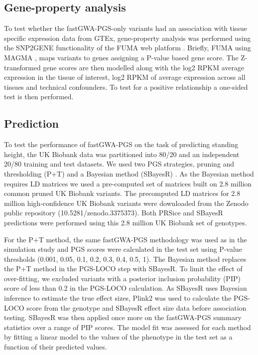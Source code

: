 \documentclass[fleqn,10pt]{wlscirep}
\begin{document}
\subsection*{Gene-property analysis}

To test whether the fastGWA-PGS-only variants had an association with tissue specific expression data from  GTEx, gene-property analysis was performed using the SNP2GENE functionality of the FUMA web platform \cite{watanabe2017functional}. Briefly, FUMA using MAGMA \cite{de2015magma}, maps variants to genes assigning a P-value based gene score. The Z-transformed gene scores are then modelled along with the log2 RPKM average expression in the tissue of interest, log2 RPKM of average expression across all tissues and technical confounders. To test for a positive relationship a one-sided test is then performed.  

\subsection*{Prediction}
To test the performance of fastGWA-PGS on the task of predicting standing height, the UK Biobank data was partitioned into 80/20 and an independent 20/80 training and test datasets. We used two PGS strategies, pruning and thresholding (P+T) and a Bayesian method (SBayesR) \cite{choi2019prsice,lloyd2019improved}. As the Bayesian method requires LD matrices we used a pre-computed set of matrices built on 2.8 million common pruned UK Biobank variants. The precomputed LD matrices for 2.8 million high-confidence UK Biobank variants were downloaded from the Zenodo public repository (10.5281/zenodo.3375373). Both PRSice and SBayesR predictions were performed using this 2.8 million UK Biobank set of genotypes. \par

For the P+T method, the same fastGWA-PGS methodology was used as in the simulation study and PGS scores were calculated in the test set using P-value thresholds (0.001, 0.05, 0.1, 0.2, 0.3, 0.4, 0.5, 1). The Bayesian method replaces the P+T method in the PGS-LOCO step with SBayesR. To limit the effect of over-fitting, we excluded variants with a posterior inclusion probability (PIP) score of less than 0.2 in the PGS-LOCO calculation. As SBayesR uses Bayesian inference to estimate the true effect sizes, Plink2 was used to calculate the PGS-LOCO score from the genotype and SBayesR effect size data before association testing. SBayesR was then applied once more on the fastGWA-PGS summary statistics over a range of PIP scores. The model fit was assessed for each method by fitting a linear model to the values of the phenotype in the test set as a function of their predicted values.\par
\end{document}
